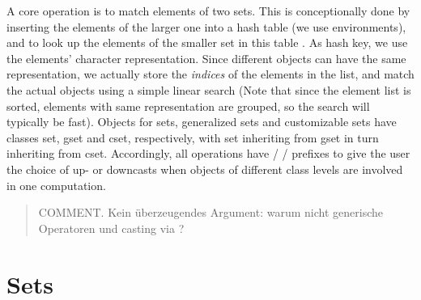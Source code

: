 \documentclass[article]{jss}
\newcommand{\class}[1]{\textsf{#1}}
\newcommand{\comment}[1]{\begin{quote} COMMENT. #1\end{quote}}
\begin{document}
A core operation is to match elements of two sets.
This is conceptionally
done by inserting the elements of the larger one into a hash
table (we use environments), and to look up the elements of the
smaller set in this table \citep[p.~391]{sets:knuth:1973}.
As hash key, we use the elements' character
representation. Since different objects can have the same
representation, we actually store the \emph{indices} of the elements in the
list, and match the actual objects using a simple linear search (Note that
since the element list is sorted, elements with same representation
are grouped, so the search will typically be fast).
Objects for sets, generalized sets and customizable sets have
 classes \class{set}, \class{gset} and \class{cset},
respectively, with \class{set} inheriting from \class{gset} in turn
inheriting from \class{cset}. Accordingly, all operations have
 /  /  prefixes to give the user
the choice of up- or downcasts when objects of different class levels
are involved in one computation.
\comment{Kein {\"u}berzeugendes Argument: warum nicht generische
  Operatoren und casting via \code{as.\{c,g\}set}?}

\section{Sets}
\label{sec:sets}
\end{document}
